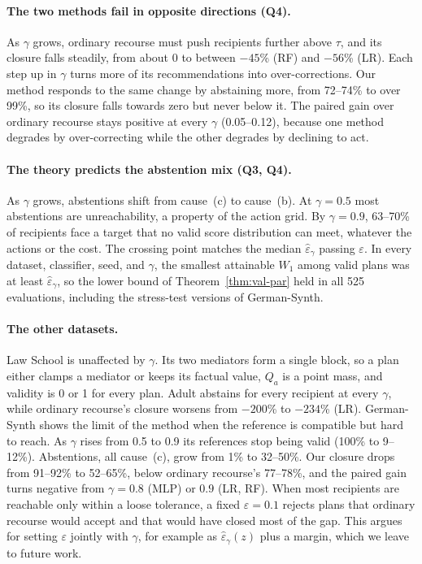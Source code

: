 \paragraph{The two methods fail in opposite directions (Q4).}
As $\gamma$ grows, ordinary recourse must push recipients further above
$\tau$, and its closure falls steadily, from about $0$ to between $-45$\%
(RF) and $-56$\% (LR). Each step up in $\gamma$ turns more of its recommendations into
over-corrections. Our method responds to the same change by abstaining more,
from 72--74\% to over 99\%, so its closure falls towards zero but never below it. The
paired gain over ordinary recourse stays positive at every $\gamma$
(0.05--0.12), because one method degrades by over-correcting while the other
degrades by declining to act.

\paragraph{The theory predicts the abstention mix (Q3, Q4).}
As $\gamma$ grows, abstentions shift from cause~(c) to cause~(b). At
$\gamma=0.5$ most abstentions are unreachability, a property of the action
grid. By $\gamma=0.9$, 63--70\% of recipients face a target that no valid
score distribution can meet, whatever the actions or the cost. The
crossing point matches the median $\hat\varepsilon_\gamma$ passing
$\varepsilon$. In every dataset, classifier, seed, and $\gamma$, the smallest
attainable $W_1$ among valid plans was at least $\hat\varepsilon_\gamma$, so the
lower bound of Theorem~\ref{thm:val-par} held in all 525 evaluations,
including the stress-test versions of German-Synth.

\paragraph{The other datasets.}
Law School is unaffected by $\gamma$. Its two mediators form a single block,
so a plan either clamps a mediator or keeps its factual value, $Q_a$ is a
point mass, and validity is 0 or 1 for every plan. Adult abstains for every
recipient at every $\gamma$, while ordinary recourse's closure worsens from
$-200$\% to $-234$\% (LR). German-Synth shows the limit of the method when
the reference is compatible but hard to reach. As $\gamma$ rises from 0.5 to
0.9 its references stop being valid (100\% to 9--12\%). Abstentions, all
cause~(c), grow from 1\% to 32--50\%. Our closure drops from 91--92\% to
52--65\%, below ordinary recourse's 77--78\%, and the paired gain turns
negative from $\gamma=0.8$ (MLP) or $0.9$ (LR, RF). When most recipients are
reachable only within a loose tolerance, a fixed $\varepsilon=0.1$ rejects
plans that ordinary recourse would accept and that would have closed most of
the gap. This argues for setting $\varepsilon$ jointly with $\gamma$, for
example as $\hat\varepsilon_\gamma(z)$ plus a margin, which we leave to future
work.

